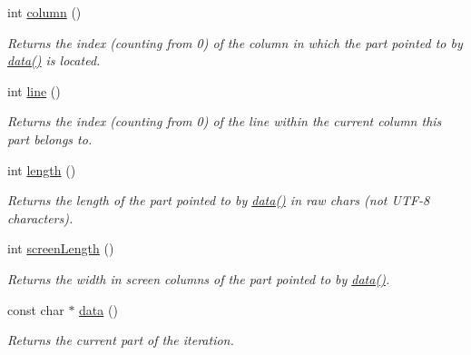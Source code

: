 \begin{DoxyCompactItemize}
int \hyperlink{class_option_parser_1_1_print_usage_implementation_1_1_line_part_iterator_a6332ea68404c325273e654c19de00e9a}{column} ()
\begin{DoxyCompactList}\small\item\em Returns the index (counting from 0) of the column in which the part pointed to by \hyperlink{class_option_parser_1_1_print_usage_implementation_1_1_line_part_iterator_abf890e680b33fb64fa49df108248f1e7}{data()} is located. \end{DoxyCompactList}\item 
int \hyperlink{class_option_parser_1_1_print_usage_implementation_1_1_line_part_iterator_a1309cb568cc2621d4f405d35a2cc4dd1}{line} ()
\begin{DoxyCompactList}\small\item\em Returns the index (counting from 0) of the line within the current column this part belongs to. \end{DoxyCompactList}\item 
int \hyperlink{class_option_parser_1_1_print_usage_implementation_1_1_line_part_iterator_a0f32a325bda4d7ae15898f07a711c137}{length} ()
\begin{DoxyCompactList}\small\item\em Returns the length of the part pointed to by \hyperlink{class_option_parser_1_1_print_usage_implementation_1_1_line_part_iterator_abf890e680b33fb64fa49df108248f1e7}{data()} in raw chars (not U\-T\-F-\/8 characters). \end{DoxyCompactList}\item 
int \hyperlink{class_option_parser_1_1_print_usage_implementation_1_1_line_part_iterator_a2708cbe66a8fb7060e4aa5841f68bc75}{screen\-Length} ()
\begin{DoxyCompactList}\small\item\em Returns the width in screen columns of the part pointed to by \hyperlink{class_option_parser_1_1_print_usage_implementation_1_1_line_part_iterator_abf890e680b33fb64fa49df108248f1e7}{data()}. \end{DoxyCompactList}\item 
const char $\ast$ \hyperlink{class_option_parser_1_1_print_usage_implementation_1_1_line_part_iterator_abf890e680b33fb64fa49df108248f1e7}{data} ()
\begin{DoxyCompactList}\small\item\em Returns the current part of the iteration. \end{DoxyCompactList}\end{DoxyCompactItemize}


